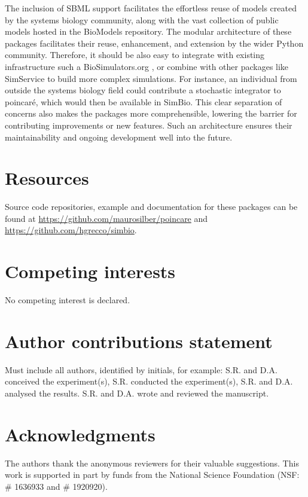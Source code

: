 \documentclass[namedate,numsec,webpdf,modern,large]{oup-authoring-template}
\theoremstyle{thmstyleone}%
\theoremstyle{thmstyletwo}%
\theoremstyle{thmstylethree}%
\begin{document}
The inclusion of \ac{SBML} support facilitates the effortless reuse of models created by the systems biology community,
along with the vast collection of public models hosted in the BioModels repository.
The modular architecture of these packages facilitates their reuse, enhancement, and extension by the wider Python community.
Therefore, it should be also easy to integrate with existing infrastructure such a BioSimulators.org  \cite{shaikhBioSimulatorsCentralRegistry2022},
or combine with other packages like SimService \cite{sego_simservice_2024} to build more complex simulations.
For instance, an individual from outside the systems biology field could contribute a stochastic integrator to poincaré,
which would then be available in SimBio.
This clear separation of concerns also makes the packages more comprehensible,
lowering the barrier for contributing improvements or new features.
Such an architecture ensures their maintainability and ongoing development well into the future.

\section{Resources}\label{resources}

Source code repositories, example and documentation for these packages can be found at
\url{https://github.com/maurosilber/poincare} and
\url{https://github.com/hgrecco/simbio}.


\section{Competing interests}
No competing interest is declared.

\section{Author contributions statement}

Must include all authors, identified by initials, for example:
S.R. and D.A. conceived the experiment(s),  S.R. conducted the experiment(s), S.R. and D.A. analysed the results.  S.R. and D.A. wrote and reviewed the manuscript.

\section{Acknowledgments}
The authors thank the anonymous reviewers for their valuable suggestions. This work is supported in part by funds from the National Science Foundation (NSF: \# 1636933 and \# 1920920).
\end{document}
